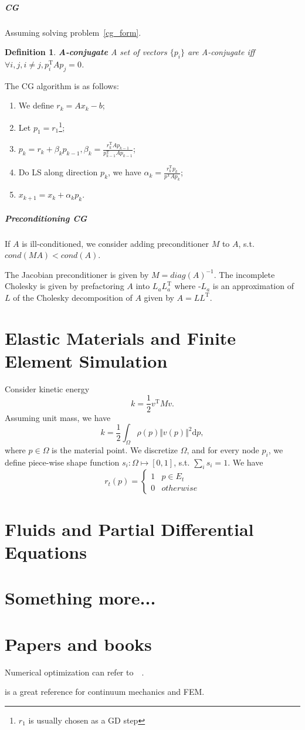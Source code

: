 \documentclass{fancydoc}
\newtheorem{mydef}{Definition}
\newcommand{\trans}{\mathrm{T}}
\newcommand{\diffd}{\mathrm{d}}
\begin{document}
\subparagraph{CG}
Assuming solving problem~\eqref{cg_form}.
\begin{mydef}
	\textbf{A-conjugate} A set of vectors $\{p_i\}$ are A-conjugate iff $\forall  i, j, i\neq j, p_i^\trans Ap_j = 0$.
\end{mydef}
The CG algorithm is as follows:
\begin{enumerate}
	\item We define $r_k = Ax_k - b$;
	\item Let $p_1 = r_1$\footnote{$r_1$ is usually chosen as a GD step};
	\item $p_k = r_k + \beta_k p_{k-1}, \beta_k = \frac{r_k^\trans Ap_{k-1}}{p_{k-1}^\trans Ap_{k-1}}$;
	\item Do LS along direction $p_k$, we have $\alpha_k = \frac{r_k^\trans p_k}{p^\trans A p_k}$;
	\item $x_{k+1} = x_k + \alpha_k p_k$.
\end{enumerate}

\subparagraph{Preconditioning CG}
If $A$ is ill-conditioned, we consider adding preconditioner $M$ to $A$, s.t. $cond(MA) < cond(A)$.

The Jacobian preconditioner is given by $M = diag(A)^{-1}$. The incomplete Cholesky is given by prefactoring $A$ into $L_a L_a^\trans$ where -$L_a$ is an approximation of $L$ of the Cholesky decomposition of $A$ given by $A=LL^\trans$.

\section{Elastic Materials and Finite Element Simulation}
Consider kinetic energy 
\begin{equation*}
k = \frac{1}{2} v^\trans Mv.
\end{equation*}
Assuming unit mass, we have
\begin{equation}
k = \frac{1}{2} \int_\Omega \rho(p) \Vert v(p) \Vert^2 \diffd p,
\end{equation}
where $p \in \Omega$ is the material point. We discretize $\Omega$, and for every node $p_i$, we define piece-wise shape function $s_i : \Omega \mapsto [0, 1]$, s.t. $\sum_i s_i = 1$. We have 
\[r_t(p) = \begin{cases}
1 & p\in E_t\\
0 & otherwise
\end{cases} 
\]
\section{Fluids and Partial Differential Equations}

\section{Something more...}

\section{Papers and books}

Numerical optimization can refer to~\cite{boyd2004convex}~\cite{nocedal2006numerical}.

\cite{bonet1997nonlinear} is a great reference for continuum mechanics and FEM.




 
\end{document}
